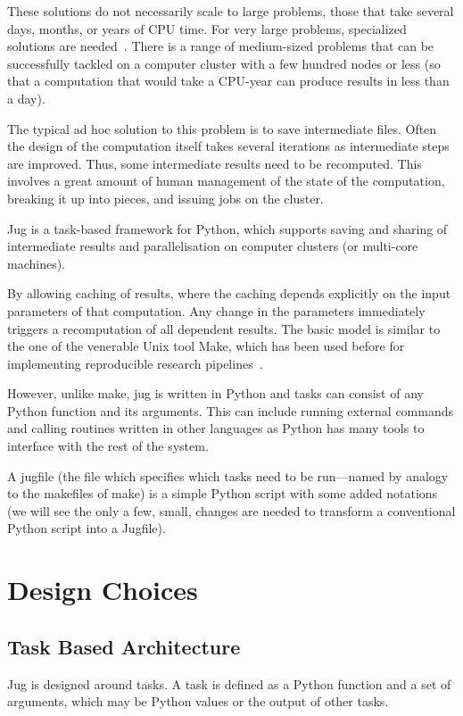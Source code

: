 \documentclass{article}
\begin{document}
These solutions do not necessarily scale to large problems, those that take
several days, months, or years of CPU time. For very large problems,
specialized solutions are needed~\citep{mapReduce}. There is a range of
medium-sized problems that can be successfully tackled on a computer cluster
with a few hundred nodes or less (so that a computation that would take a
CPU-year can produce results in less than a day).

The typical ad hoc solution to this problem is to save intermediate files.
Often the design of the computation itself takes several iterations as
intermediate steps are improved. Thus, some intermediate results need to be
recomputed. This involves a great amount of human management of the state of
the computation, breaking it up into pieces, and issuing jobs on the cluster.

Jug is a task-based framework for Python, which supports saving and sharing of
intermediate results and parallelisation on computer clusters (or multi-core
machines).

By allowing caching of results, where the caching depends explicitly on the
input parameters of that computation. Any change in the parameters immediately
triggers a recomputation of all dependent results. The basic model is similar
to the one of the venerable Unix tool Make, which has been used before for
implementing reproducible research pipelines~\citep{Schwab00makingscientific}.

However, unlike make, jug is written in Python and tasks can consist of any
Python function and its arguments. This can include running external commands
and calling routines written in other languages as Python has many tools to
interface with the rest of the system.

A jugfile (the file which specifies which tasks need to be run---named by
analogy to the makefiles of make) is a simple Python script with some added
notations (we will see the only a few, small, changes are needed to transform a
conventional Python script into a Jugfile).

\section{Design Choices}
\subsection{Task Based Architecture}

Jug is designed around tasks. A task is defined as a Python function and a set
of arguments, which may be Python values or the output of other tasks.
\end{document}
